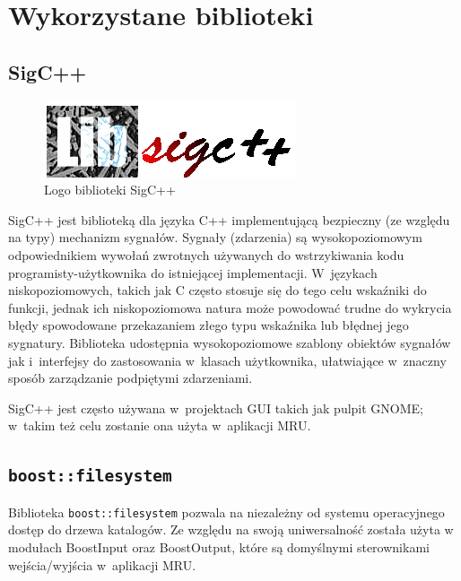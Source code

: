 
\section{Wykorzystane biblioteki}
\label{wykorzystane-biblioteki}

\subsection{SigC++}
\begin{figure}
\begin{center}
\includegraphics[scale=0.50]{img/sigcpp_logo.png}
\end{center}
\caption{Logo biblioteki SigC++}
\end{figure}
\par
SigC++ jest biblioteką dla języka C++ implementującą bezpieczny (ze względu na typy) mechanizm sygnałów.
Sygnały (zdarzenia) są wysokopoziomowym odpowiednikiem wywołań zwrotnych używanych do wstrzykiwania kodu programisty-użytkownika do istniejącej implementacji. W~językach niskopoziomowych, takich jak C często stosuje się do tego celu wskaźniki do funkcji, jednak ich niskopoziomowa natura może powodować trudne do wykrycia błędy spowodowane przekazaniem złego typu wskaźnika lub błędnej jego sygnatury. Biblioteka udostępnia wysokopoziomowe szablony obiektów sygnałów jak i~interfejsy do zastosowania w~klasach użytkownika, ułatwiające w~znaczny sposób zarządzanie podpiętymi zdarzeniami.\\
\par
SigC++ jest często używana w~projektach GUI takich jak pulpit GNOME; w~takim też celu zostanie ona użyta w~aplikacji MRU.

\subsection{\texttt{boost::filesystem}}
\par
Biblioteka \texttt{boost::filesystem} pozwala na niezależny od systemu operacyjnego dostęp do drzewa katalogów\cite{wiecej-niz-cpp-boost}. Ze względu na swoją uniwersalność została użyta w modułach BoostInput oraz BoostOutput, które są domyślnymi sterownikami wejścia/wyjścia w~aplikacji MRU.

